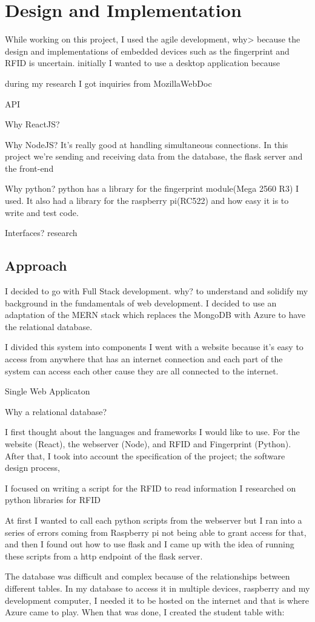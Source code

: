 \chapter{Design and Implementation}
While working on this project, I used the agile development, why> because the design and implementations of embedded devices such as the fingerprint and RFID is uncertain.  initially I wanted to use a desktop application because 

during my research I got inquiries from MozillaWebDoc

API


Why ReactJS?

Why NodeJS?
It's really good at handling simultaneous connections. In this project we're sending and receiving data from the database, the flask server and the front-end

Why python?
python has a library for the fingerprint module(Mega 2560 R3) I used. It also had a library for the raspberry pi(RC522) and how easy it is to write and test code.

Interfaces?
 research

\section{Approach}

I decided to go with Full Stack development. why? to understand and solidify my background in the fundamentals of web development. I decided to use an adaptation of the MERN stack which replaces the MongoDB with Azure to have the relational database.

I divided this system into components 
I went with a website because it's easy to access from anywhere that has an internet connection and each part of the system can access each other cause they are all connected to the internet. 

Single Web Applicaton

Why a relational database?

I first thought about the languages and frameworks I would like to use. For the website (React), the webserver (Node), and RFID and Fingerprint (Python). After that, I took into account the specification of the project; the software design process, 

I focused on writing a script for the RFID to read information 
I researched on python libraries for RFID 


At first I wanted to call each python scripts from the webserver but I ran into a series of errors coming from Raspberry pi not being able to grant access for that, and then I found out how to use flask and I came up with the idea of running these scripts from a http endpoint of the flask server.

The database was difficult and complex because of the relationships between different tables. In my database to access it in multiple devices, raspberry and my development computer, I needed it to be hosted on the internet and that is where Azure came to play. When that was done, I created the student table with:

